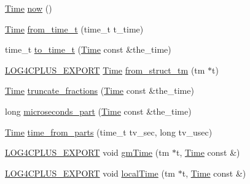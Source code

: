 \begin{DoxyCompactItemize}
\hyperlink{namespacelog4cplus_1_1helpers_af05d40c37e1cccf9d11d0cbb7426bcd4}{Time} \hyperlink{namespacelog4cplus_1_1helpers_a1085a8b18eff5fed04b08ec6a2c3e452}{now} ()
\item 
\hyperlink{namespacelog4cplus_1_1helpers_af05d40c37e1cccf9d11d0cbb7426bcd4}{Time} \hyperlink{namespacelog4cplus_1_1helpers_ad3311ebfb278613d32dc70e4fef28686}{from\-\_\-time\-\_\-t} (time\-\_\-t t\-\_\-time)
\item 
time\-\_\-t \hyperlink{namespacelog4cplus_1_1helpers_a1de05f00a5784ffead1634d1b554afd9}{to\-\_\-time\-\_\-t} (\hyperlink{namespacelog4cplus_1_1helpers_af05d40c37e1cccf9d11d0cbb7426bcd4}{Time} const \&the\-\_\-time)
\item 
\hyperlink{config_8hxx_ab13cb1a5317c245ee2ef4f2bfe0cfb2d}{L\-O\-G4\-C\-P\-L\-U\-S\-\_\-\-E\-X\-P\-O\-R\-T} \hyperlink{namespacelog4cplus_1_1helpers_af05d40c37e1cccf9d11d0cbb7426bcd4}{Time} \hyperlink{namespacelog4cplus_1_1helpers_aa86444ce227000233ba6806a68cca892}{from\-\_\-struct\-\_\-tm} (tm $\ast$t)
\item 
\hyperlink{namespacelog4cplus_1_1helpers_af05d40c37e1cccf9d11d0cbb7426bcd4}{Time} \hyperlink{namespacelog4cplus_1_1helpers_af13c1dfc48a42bd89348f46972fe78b6}{truncate\-\_\-fractions} (\hyperlink{namespacelog4cplus_1_1helpers_af05d40c37e1cccf9d11d0cbb7426bcd4}{Time} const \&the\-\_\-time)
\item 
long \hyperlink{namespacelog4cplus_1_1helpers_a0b745663dd3601c1d5c2cca971c62a70}{microseconds\-\_\-part} (\hyperlink{namespacelog4cplus_1_1helpers_af05d40c37e1cccf9d11d0cbb7426bcd4}{Time} const \&the\-\_\-time)
\item 
\hyperlink{namespacelog4cplus_1_1helpers_af05d40c37e1cccf9d11d0cbb7426bcd4}{Time} \hyperlink{namespacelog4cplus_1_1helpers_a02b3e0f65785711bbc004c3a28fc7775}{time\-\_\-from\-\_\-parts} (time\-\_\-t tv\-\_\-sec, long tv\-\_\-usec)
\item 
\hyperlink{config_8hxx_ab13cb1a5317c245ee2ef4f2bfe0cfb2d}{L\-O\-G4\-C\-P\-L\-U\-S\-\_\-\-E\-X\-P\-O\-R\-T} void \hyperlink{namespacelog4cplus_1_1helpers_a56e65d05975cb29c843eca913eaa4135}{gm\-Time} (tm $\ast$t, \hyperlink{namespacelog4cplus_1_1helpers_af05d40c37e1cccf9d11d0cbb7426bcd4}{Time} const \&)
\item 
\hyperlink{config_8hxx_ab13cb1a5317c245ee2ef4f2bfe0cfb2d}{L\-O\-G4\-C\-P\-L\-U\-S\-\_\-\-E\-X\-P\-O\-R\-T} void \hyperlink{namespacelog4cplus_1_1helpers_a6b5aff14d7ce27e2ec1b775a886bd88d}{local\-Time} (tm $\ast$t, \hyperlink{namespacelog4cplus_1_1helpers_af05d40c37e1cccf9d11d0cbb7426bcd4}{Time} const \&)

\end{DoxyCompactItemize}
